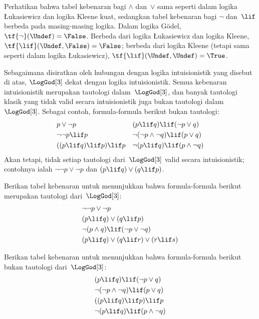 \documentclass[../../../include/open-logic-section]{subfiles}
\begin{document}
Perhatikan bahwa tabel kebenaran bagi $\land$ dan~$\lor$ sama seperti dalam
logika \L ukasiewicz dan logika Kleene kuat, sedangkan tabel kebenaran bagi
$\lnot$ dan~$\lif$ berbeda pada masing-masing logika. Dalam logika G\"odel,
$\tf{\lnot}(\Undef)=\False$. Berbeda dari logika \L ukasiewicz dan logika
Kleene, $\tf{\lif}(\Undef,\False)=\False$; berbeda dari logika Kleene
(tetapi sama seperti dalam logika \L ukasiewicz),
$\tf{\lif}(\Undef,\Undef)=\True$.

Sebagaimana disiratkan oleh hubungan dengan logika intuisionistik yang disebut
di atas, $\LogGod[3]$ dekat dengan logika intuisionistik. Semua kebenaran
intuisionistik merupakan tautologi dalam~$\LogGod[3]$, dan banyak tautologi
klasik yang tidak valid secara intuisionistik juga bukan tautologi
dalam~$\LogGod[3]$. Sebagai contoh, formula-formula berikut bukan tautologi:
\begin{align*}
  & p \lor \lnot p && (p \lif q) \lif (\lnot p \lor q) \\
  & \lnot\lnot p \lif p && \lnot(\lnot p \land \lnot q) \lif (p \lor q) \\
  & ((p \lif q) \lif p) \lif p && \lnot(p \lif q) \lif (p \land \lnot q)
\end{align*}
Akan tetapi, tidak setiap tautologi dari~$\LogGod[3]$ valid secara
intuisionistik; contohnya ialah $\lnot\lnot p\lor\lnot p$ dan
$(p\lif q)\lor(q\lif p)$.

\begin{prob}
  Berikan tabel kebenaran untuk menunjukkan bahwa formula-formula berikut
  merupakan tautologi dari~$\LogGod[3]$:
  \begin{align*}
    & \lnot\lnot p \lor \lnot p\\
    & (p \lif q) \lor (q \lif p) \\
    & \lnot(p \land q) \lif (\lnot p \lor \lnot q) \\
    & (p \lif q) \lor (q \lif r) \lor (r \lif s)
  \end{align*}
\end{prob}

\begin{prob}
  Berikan tabel kebenaran untuk menunjukkan bahwa formula-formula berikut
  bukan tautologi dari~$\LogGod[3]$:
  \begin{align*}
    & (p \lif q) \lif (\lnot p \lor q) \\
    & \lnot(\lnot p \land \lnot q) \lif (p \lor q) \\
    & ((p \lif q) \lif p) \lif p \\
    & \lnot(p \lif q) \lif (p \land \lnot q)
  \end{align*}
\end{prob}
\end{document}

